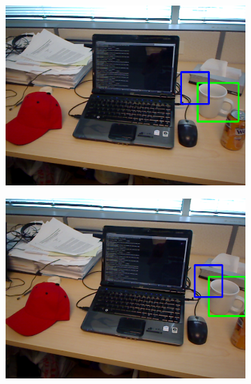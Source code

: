 \begin{figure}
	\begin{subfigure}[b]{0.3\textwidth}
		\includegraphics[width=\textwidth]{img/seguimiento_frame_template/frame_template-desk_1-coffee_mug_5-frame_29.png}
	\end{subfigure}
	\begin{subfigure}[b]{0.3\textwidth}
		\includegraphics[width=\textwidth]{img/seguimiento_frame_template/frame_template-desk_1-coffee_mug_5-frame_30.png}
	\end{subfigure}
	\begin{subfigure}[b]{0.3\textwidth}

\end{subfigure}
\end{figure}
